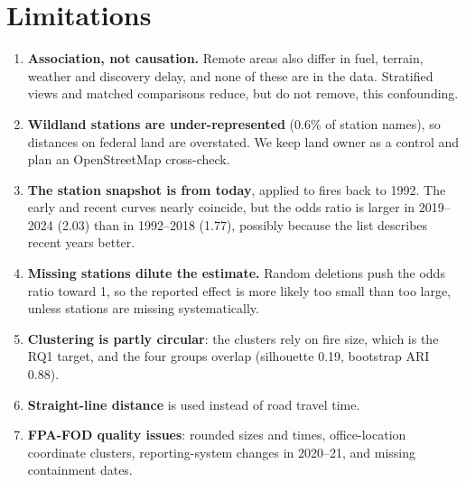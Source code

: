 \documentclass[10pt,twocolumn,letterpaper]{article}
\begin{document}
\section{Limitations}
\begin{enumerate}
\item \textbf{Association, not causation.} Remote areas also differ in fuel, terrain, weather and discovery delay, and none of these are in the data. Stratified views and matched comparisons reduce, but do not remove, this confounding.
\item \textbf{Wildland stations are under-represented} (0.6\% of station names), so distances on federal land are overstated. We keep land owner as a control and plan an OpenStreetMap cross-check.
\item \textbf{The station snapshot is from today}, applied to fires back to 1992. The early and recent curves nearly coincide, but the odds ratio is larger in 2019--2024 (2.03) than in 1992--2018 (1.77), possibly because the list describes recent years better.
\item \textbf{Missing stations dilute the estimate.} Random deletions push the odds ratio toward 1, so the reported effect is more likely too small than too large, unless stations are missing systematically.
\item \textbf{Clustering is partly circular}: the clusters rely on fire size, which is the RQ1 target, and the four groups overlap (silhouette 0.19, bootstrap ARI 0.88).
\item \textbf{Straight-line distance} is used instead of road travel time.
\item \textbf{FPA-FOD quality issues}: rounded sizes and times, office-location coordinate clusters, reporting-system changes in 2020--21, and missing containment dates.
\end{enumerate}
\end{document}
